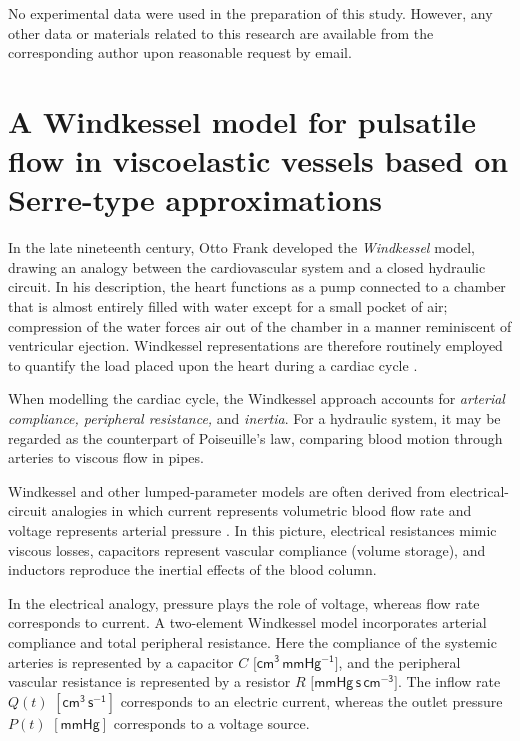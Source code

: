 \documentclass[alpha-refs, 12pt]{wiley-article}
\begin{document}
No experimental data were used in the preparation of this study. However, any other data or materials related to this research are available from the corresponding author upon reasonable request by email.

\printendnotes

\printglossary[type=\acronymtype]



\appendix
\section{A Windkessel model for pulsatile flow in viscoelastic vessels based on Serre-type approximations}\label{sec:windkessel}

In the late nineteenth century, Otto Frank developed the \emph{Windkessel} model, drawing an analogy between the cardiovascular system and a closed hydraulic circuit. In his description, the heart functions as a pump connected to a chamber that is almost entirely filled with water except for a small pocket of air; compression of the water forces air out of the chamber in a manner reminiscent of ventricular ejection. Windkessel representations are therefore routinely employed to quantify the load placed upon the heart during a cardiac cycle \cite{Catanho2012}.

When modelling the cardiac cycle, the Windkessel approach accounts for \emph{arterial compliance, peripheral resistance,} and \emph{inertia}. For a hydraulic system, it may be regarded as the counterpart of Poiseuille's law, comparing blood motion through arteries to viscous flow in pipes.

Windkessel and other lumped-parameter models are often derived from electrical-circuit analogies in which current represents volumetric blood flow rate and voltage represents arterial pressure \cite{Avolio1980, Segers1998, Milisic2004}. In this picture, electrical resistances mimic viscous losses, capacitors represent vascular compliance (volume storage), and inductors reproduce the inertial effects of the blood column.

In the electrical analogy, pressure plays the role of voltage, whereas flow rate corresponds to current. A two-element Windkessel model incorporates arterial compliance and total peripheral resistance. Here the compliance of the systemic arteries is represented by a capacitor \(\!C\) \(\bigl[\mathsf{cm^{3}\,mmHg^{-1}}\bigr]\), and the peripheral vascular resistance is represented by a resistor \(R\) \(\bigl[\mathsf{mmHg\,s\,cm^{-3}}\bigr]\). The inflow rate \(Q(t)\) \([\mathsf{cm^{3}\,s^{-1}}]\) corresponds to an electric current, whereas the outlet pressure \(P(t)\) \([\mathsf{mmHg}]\) corresponds to a voltage source.
\end{document}
